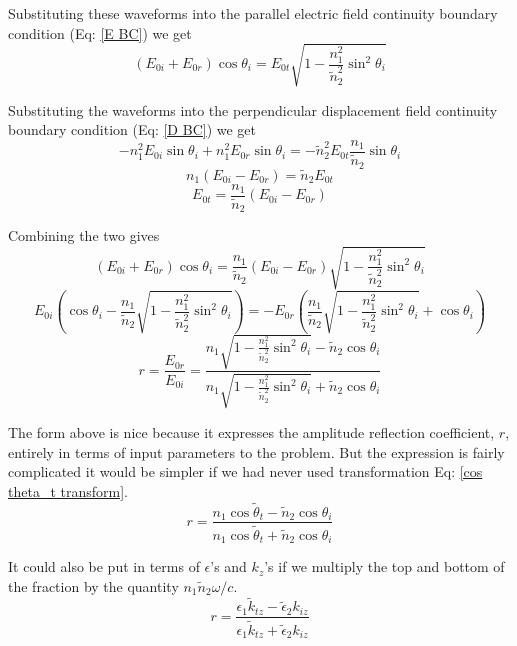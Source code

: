\documentclass[10pt,a4paper]{article}
\begin{document}
Substituting these waveforms into the parallel electric field continuity boundary condition (Eq: \ref{E BC}) we get
\begin{equation}
(E_{0i}+E_{0r})\cos\theta_i = E_{0t}\sqrt{1-\frac{n_1^2}{\tilde{n}_2^2}\sin^2\theta_i}
\end{equation}

Substituting the waveforms into the perpendicular displacement field continuity boundary condition (Eq: \ref{D BC}) we get
\begin{equation}
-n_1^2 E_{0i}\sin\theta_i+n_1^2E_{0r}\sin\theta_i = -\tilde{n}_2^2 E_{0t}\frac{n_1}{\tilde{n}_2}\sin\theta_i
\end{equation}
\begin{equation}
n_1(E_{0i}-E_{0r})=\tilde{n}_2E_{0t}
\end{equation}
\begin{equation}
E_{0t} = \frac{n_1}{\tilde{n}_2}(E_{0i}-E_{0r})
\end{equation}

Combining the two gives
\begin{equation}
(E_{0i}+E_{0r})\cos\theta_i=\frac{n_1}{\tilde{n}_2}(E_{0i}-E_{0r})\sqrt{1-\frac{n_1^2}{\tilde{n}_2^2}\sin^2\theta_i}
\end{equation}
\begin{equation}
E_{0i}\left(\cos\theta_i-\frac{n_1}{\tilde{n}_2}\sqrt{1-\frac{n_1^2}{\tilde{n}_2^2}\sin^2\theta_i}\right)=
-E_{0r}\left(\frac{n_1}{\tilde{n}_2}\sqrt{1-\frac{n_1^2}{\tilde{n}_2^2}\sin^2\theta_i}+\cos\theta_i\right)
\end{equation}
\begin{equation}\label{r}\boxed{
r=\frac{E_{0r}}{E_{0i}}=\frac
{n_1\sqrt{1-\frac{n_1^2}{\tilde{n}_2^2}\sin^2\theta_i}-\tilde{n}_2\cos\theta_i}
{n_1\sqrt{1-\frac{n_1^2}{\tilde{n}_2^2}\sin^2\theta_i}+\tilde{n}_2\cos\theta_i}
}\end{equation}

The form above is nice because it expresses the amplitude reflection coefficient, $r$, entirely in terms of input parameters to the problem. But the expression is fairly complicated it would be simpler if we had never used transformation Eq: \ref{cos theta_t transform}.
\begin{equation}\label{r(n,theta)}
r=\frac{n_1\cos\tilde{\theta}_t-\tilde{n}_2\cos\theta_i}
{n_1\cos\tilde{\theta}_t+\tilde{n}_2\cos\theta_i}
\end{equation}

It could also be put in terms of $\epsilon$'s and $k_z$'s if we multiply the top and bottom of the fraction by the quantity $n_1\tilde{n}_2\omega/c$.
\begin{equation}\label{r(k,e)}
r=\frac{\epsilon_1\tilde{k}_{tz}-\tilde{\epsilon}_2k_{iz}}{\epsilon_1\tilde{k}_{tz}+\tilde{\epsilon}_2k_{iz}}
\end{equation}
\end{document}
